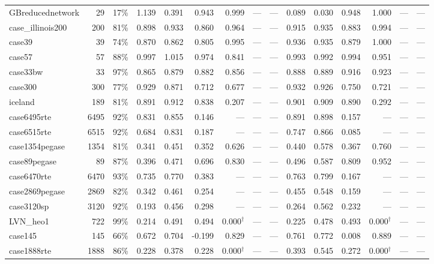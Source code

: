 \documentclass[10pt]{article}
\begin{document}
\begin{landscape}
\begin{table}[H]
\begin{tabular}{lrr rrrrrr rrrrrr}
GBreducednetwork & 29 & 17\% & 1.139 & 0.391 & 0.943 & 0.999 & --- & --- & 0.089 & 0.030 & 0.948 & 1.000 & --- & --- \\
case\_illinois200 & 200 & 81\% & 0.898 & 0.933 & 0.860 & 0.964 & --- & --- & 0.915 & 0.935 & 0.883 & 0.994 & --- & --- \\
case39 & 39 & 74\% & 0.870 & 0.862 & 0.805 & 0.995 & --- & --- & 0.936 & 0.935 & 0.879 & 1.000 & --- & --- \\
case57 & 57 & 88\% & 0.997 & 1.015 & 0.974 & 0.841 & --- & --- & 0.993 & 0.992 & 0.994 & 0.951 & --- & --- \\
case33bw & 33 & 97\% & 0.865 & 0.879 & 0.882 & 0.856 & --- & --- & 0.888 & 0.889 & 0.916 & 0.923 & --- & --- \\
case300 & 300 & 77\% & 0.929 & 0.871 & 0.712 & 0.677 & --- & --- & 0.932 & 0.926 & 0.750 & 0.721 & --- & --- \\
iceland & 189 & 81\% & 0.891 & 0.912 & 0.838 & 0.207 & --- & --- & 0.901 & 0.909 & 0.890 & 0.292 & --- & --- \\
case6495rte & 6495 & 92\% & 0.831 & 0.855 & 0.146 & --- & --- & --- & 0.891 & 0.898 & 0.157 & --- & --- & --- \\
case6515rte & 6515 & 92\% & 0.684 & 0.831 & 0.187 & --- & --- & --- & 0.747 & 0.866 & 0.085 & --- & --- & --- \\
case1354pegase & 1354 & 81\% & 0.341 & 0.451 & 0.352 & 0.626 & --- & --- & 0.440 & 0.578 & 0.367 & 0.760 & --- & --- \\
case89pegase & 89 & 87\% & 0.396 & 0.471 & 0.696 & 0.830 & --- & --- & 0.496 & 0.587 & 0.809 & 0.952 & --- & --- \\
case6470rte & 6470 & 93\% & 0.735 & 0.770 & 0.383 & --- & --- & --- & 0.763 & 0.799 & 0.167 & --- & --- & --- \\
case2869pegase & 2869 & 82\% & 0.342 & 0.461 & 0.254 & --- & --- & --- & 0.455 & 0.548 & 0.159 & --- & --- & --- \\
case3120sp & 3120 & 92\% & 0.193 & 0.456 & 0.298 & --- & --- & --- & 0.264 & 0.562 & 0.232 & --- & --- & --- \\
LVN\_heo1 & 722 & 99\% & 0.214 & 0.491 & 0.494 & 0.000$^\dagger$ & --- & --- & 0.225 & 0.478 & 0.493 & 0.000$^\dagger$ & --- & --- \\
case145 & 145 & 66\% & 0.672 & 0.704 & -0.199 & 0.829 & --- & --- & 0.761 & 0.772 & 0.008 & 0.889 & --- & --- \\
case1888rte & 1888 & 86\% & 0.228 & 0.378 & 0.228 & 0.000$^\dagger$ & --- & --- & 0.393 & 0.545 & 0.272 & 0.000$^\dagger$ & --- & --- \\

\end{tabular}
\end{table}
\end{landscape}
\end{document}
